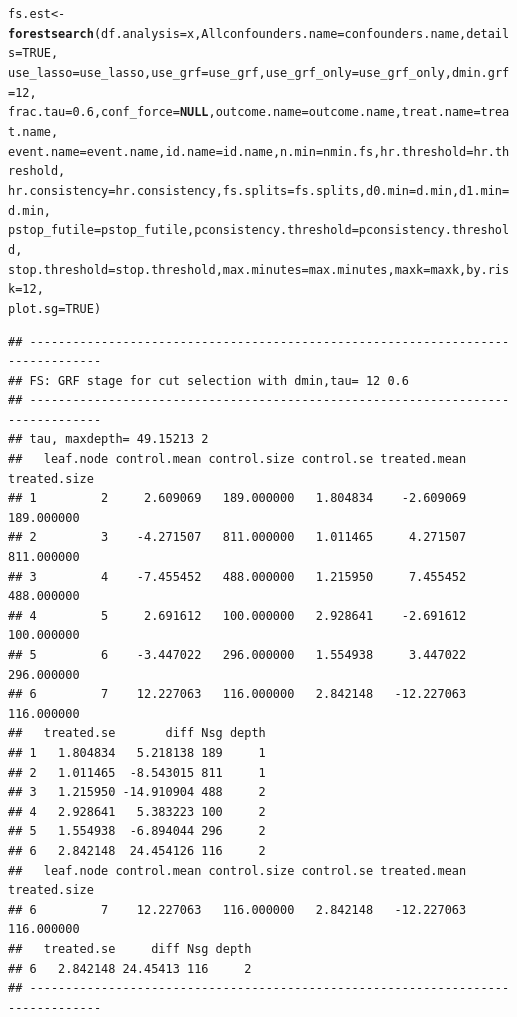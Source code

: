\documentclass[12pt]{article}
\makeatletter
\newcommand{\hlnum}[1]{\textcolor[rgb]{0.686,0.059,0.569}{#1}}%
\newcommand{\hlstd}[1]{\textcolor[rgb]{0.345,0.345,0.345}{#1}}%
\newcommand{\hlkwa}[1]{\textcolor[rgb]{0.161,0.373,0.58}{\textbf{#1}}}%
\newcommand{\hlkwb}[1]{\textcolor[rgb]{0.69,0.353,0.396}{#1}}%
\newcommand{\hlkwc}[1]{\textcolor[rgb]{0.333,0.667,0.333}{#1}}%
\newcommand{\hlkwd}[1]{\textcolor[rgb]{0.737,0.353,0.396}{\textbf{#1}}}%
\newenvironment{kframe}{%
 \def\at@end@of@kframe{}%
 \ifinner\ifhmode%
  \def\at@end@of@kframe{\end{minipage}}%
  \begin{minipage}{\columnwidth}%
 \fi\fi%
 \def\FrameCommand##1{\hskip\@totalleftmargin \hskip-\fboxsep
 \colorbox{shadecolor}{##1}\hskip-\fboxsep
     \hskip-\linewidth \hskip-\@totalleftmargin \hskip\columnwidth}%
 \MakeFramed {\advance\hsize-\width
   \@totalleftmargin\z@ \linewidth\hsize
   \@setminipage}}%
 {\par\unskip\endMakeFramed%
 \at@end@of@kframe}
\newenvironment{knitrout}{}{} %
\makeatother
\begin{document}
\begin{knitrout}
\begin{kframe}
\begin{alltt}
\hlstd{fs.est} \hlkwb{<-} \hlkwd{forestsearch}\hlstd{(}\hlkwc{df.analysis} \hlstd{= x,} \hlkwc{Allconfounders.name} \hlstd{= confounders.name,} \hlkwc{details} \hlstd{=} \hlnum{TRUE}\hlstd{,}
    \hlkwc{use_lasso} \hlstd{= use_lasso,} \hlkwc{use_grf} \hlstd{= use_grf,} \hlkwc{use_grf_only} \hlstd{= use_grf_only,} \hlkwc{dmin.grf} \hlstd{=} \hlnum{12}\hlstd{,}
    \hlkwc{frac.tau} \hlstd{=} \hlnum{0.6}\hlstd{,} \hlkwc{conf_force} \hlstd{=} \hlkwa{NULL}\hlstd{,} \hlkwc{outcome.name} \hlstd{= outcome.name,} \hlkwc{treat.name} \hlstd{= treat.name,}
    \hlkwc{event.name} \hlstd{= event.name,} \hlkwc{id.name} \hlstd{= id.name,} \hlkwc{n.min} \hlstd{= nmin.fs,} \hlkwc{hr.threshold} \hlstd{= hr.threshold,}
    \hlkwc{hr.consistency} \hlstd{= hr.consistency,} \hlkwc{fs.splits} \hlstd{= fs.splits,} \hlkwc{d0.min} \hlstd{= d.min,} \hlkwc{d1.min} \hlstd{= d.min,}
    \hlkwc{pstop_futile} \hlstd{= pstop_futile,} \hlkwc{pconsistency.threshold} \hlstd{= pconsistency.threshold,}
    \hlkwc{stop.threshold} \hlstd{= stop.threshold,} \hlkwc{max.minutes} \hlstd{= max.minutes,} \hlkwc{maxk} \hlstd{= maxk,} \hlkwc{by.risk} \hlstd{=} \hlnum{12}\hlstd{,}
    \hlkwc{plot.sg} \hlstd{=} \hlnum{TRUE}\hlstd{)}
\end{alltt}
\begin{verbatim}
## --------------------------------------------------------------------------------
## FS: GRF stage for cut selection with dmin,tau= 12 0.6 
## --------------------------------------------------------------------------------
## tau, maxdepth= 49.15213 2 
##   leaf.node control.mean control.size control.se treated.mean treated.size
## 1         2     2.609069   189.000000   1.804834    -2.609069   189.000000
## 2         3    -4.271507   811.000000   1.011465     4.271507   811.000000
## 3         4    -7.455452   488.000000   1.215950     7.455452   488.000000
## 4         5     2.691612   100.000000   2.928641    -2.691612   100.000000
## 5         6    -3.447022   296.000000   1.554938     3.447022   296.000000
## 6         7    12.227063   116.000000   2.842148   -12.227063   116.000000
##   treated.se       diff Nsg depth
## 1   1.804834   5.218138 189     1
## 2   1.011465  -8.543015 811     1
## 3   1.215950 -14.910904 488     2
## 4   2.928641   5.383223 100     2
## 5   1.554938  -6.894044 296     2
## 6   2.842148  24.454126 116     2
##   leaf.node control.mean control.size control.se treated.mean treated.size
## 6         7    12.227063   116.000000   2.842148   -12.227063   116.000000
##   treated.se     diff Nsg depth
## 6   2.842148 24.45413 116     2
## --------------------------------------------------------------------------------

\end{verbatim}
\end{kframe}
\end{knitrout}
\end{document}
